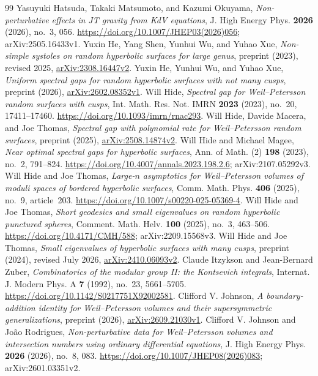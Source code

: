\begin{thebibliography}{99}
 Yasuyuki Hatsuda, Takaki Matsumoto, and Kazumi Okuyama, \emph{Non-perturbative effects in JT gravity from KdV equations}, J. High Energy Phys. \textbf{2026} (2026), no.~3, 056. \url{https://doi.org/10.1007/JHEP03(2026)056}; arXiv:2505.16433v1.
 Yuxin He, Yang Shen, Yunhui Wu, and Yuhao Xue, \emph{Non-simple systoles on random hyperbolic surfaces for large genus}, preprint (2023), revised 2025, \href{https://arxiv.org/abs/2308.16447v2}{arXiv:2308.16447v2}.
 Yuxin He, Yunhui Wu, and Yuhao Xue, \emph{Uniform spectral gaps for random hyperbolic surfaces with not many cusps}, preprint (2026), \href{https://arxiv.org/abs/2602.08352v1}{arXiv:2602.08352v1}.
 Will Hide, \emph{Spectral gap for Weil--Petersson random surfaces with cusps}, Int. Math. Res. Not. IMRN \textbf{2023} (2023), no.~20, 17411--17460. \url{https://doi.org/10.1093/imrn/rnac293}.
 Will Hide, Davide Macera, and Joe Thomas, \emph{Spectral gap with polynomial rate for Weil--Petersson random surfaces}, preprint (2025), \href{https://arxiv.org/abs/2508.14874v2}{arXiv:2508.14874v2}.
 Will Hide and Michael Magee, \emph{Near optimal spectral gaps for hyperbolic surfaces}, Ann. of Math. (2) \textbf{198} (2023), no.~2, 791--824. \url{https://doi.org/10.4007/annals.2023.198.2.6}; arXiv:2107.05292v3.
 Will Hide and Joe Thomas, \emph{Large-$n$ asymptotics for Weil--Petersson volumes of moduli spaces of bordered hyperbolic surfaces}, Comm. Math. Phys. \textbf{406} (2025), no.~9, article~203. \url{https://doi.org/10.1007/s00220-025-05369-4}.
 Will Hide and Joe Thomas, \emph{Short geodesics and small eigenvalues on random hyperbolic punctured spheres}, Comment. Math. Helv. \textbf{100} (2025), no.~3, 463--506. \url{https://doi.org/10.4171/CMH/588}; arXiv:2209.15568v3.
 Will Hide and Joe Thomas, \emph{Small eigenvalues of hyperbolic surfaces with many cusps}, preprint (2024), revised July 2026, \href{https://arxiv.org/abs/2410.06093v2}{arXiv:2410.06093v2}.
 Claude Itzykson and Jean-Bernard Zuber, \emph{Combinatorics of the modular group II: the Kontsevich integrals}, Internat. J. Modern Phys. A \textbf{7} (1992), no.~23, 5661--5705. \url{https://doi.org/10.1142/S0217751X92002581}.
 Clifford V. Johnson, \emph{A boundary-addition identity for Weil--Petersson volumes and their supersymmetric generalizations}, preprint (2026), \href{https://arxiv.org/abs/2609.21030v1}{arXiv:2609.21030v1}.
 Clifford V. Johnson and Jo\~ao Rodrigues, \emph{Non-perturbative data for Weil--Petersson volumes and intersection numbers using ordinary differential equations}, J. High Energy Phys. \textbf{2026} (2026), no.~8, 083. \url{https://doi.org/10.1007/JHEP08(2026)083}; arXiv:2601.03351v2.

\end{thebibliography}
